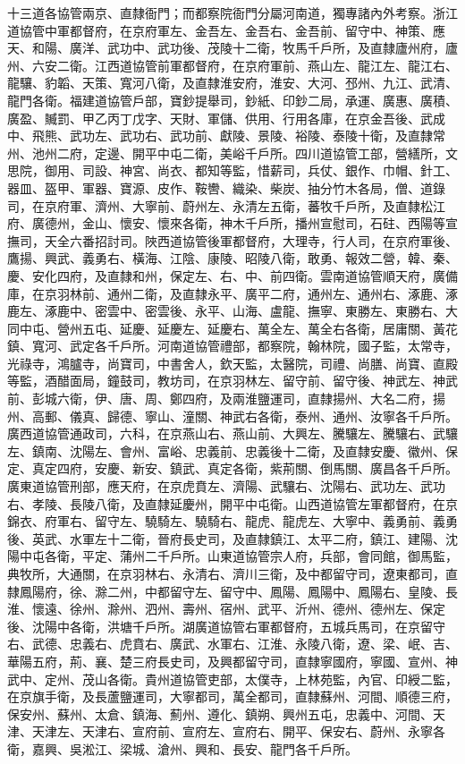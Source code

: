 十三道各協管兩京、直隸衙門；而都察院衙門分屬河南道，獨專諸內外考察。浙江道協管中軍都督府，在京府軍左、金吾左、金吾右、金吾前、留守中、神策、應天、和陽、廣洋、武功中、武功後、茂陵十二衛，牧馬千戶所，及直隸廬州府，廬州、六安二衛。江西道協管前軍都督府，在京府軍前、燕山左、龍江左、龍江右、龍驤、豹韜、天策、寬河八衛，及直隸淮安府，淮安、大河、邳州、九江、武清、龍門各衛。福建道協管戶部，寶鈔提舉司，鈔紙、印鈔二局，承運、廣惠、廣積、廣盈、贓罰、甲乙丙丁戊字、天財、軍儲、供用、行用各庫，在京金吾後、武成中、飛熊、武功左、武功右、武功前、獻陵、景陵、裕陵、泰陵十衛，及直隸常州、池州二府，定邊、開平中屯二衛，美峪千戶所。四川道協管工部，營繕所，文思院，御用、司設、神宮、尚衣、都知等監，惜薪司，兵仗、銀作、巾帽、針工、器皿、盔甲、軍器、寶源、皮作、鞍轡、織染、柴炭、抽分竹木各局，僧、道錄司，在京府軍、濟州、大寧前、蔚州左、永清左五衛，蕃牧千戶所，及直隸松江府、廣德州，金山、懷安、懷來各衛，神木千戶所，播州宣慰司，石砫、西陽等宣撫司，天全六番招討司。陜西道協管後軍都督府，大理寺，行人司，在京府軍後、鷹揚、興武、義勇右、橫海、江陰、康陵、昭陵八衛，敢勇、報效二營，韓、秦、慶、安化四府，及直隸和州，保定左、右、中、前四衛。雲南道協管順天府，廣備庫，在京羽林前、通州二衛，及直隸永平、廣平二府，通州左、通州右、涿鹿、涿鹿左、涿鹿中、密雲中、密雲後、永平、山海、盧龍、撫寧、東勝左、東勝右、大同中屯、營州五屯、延慶、延慶左、延慶右、萬全左、萬全右各衛，居庸關、黃花鎮、寬河、武定各千戶所。河南道協管禮部，都察院，翰林院，國子監，太常寺，光祿寺，鴻臚寺，尚寶司，中書舍人，欽天監，太醫院，司禮、尚膳、尚寶、直殿等監，酒醋面局，鐘鼓司，教坊司，在京羽林左、留守前、留守後、神武左、神武前、彭城六衛，伊、唐、周、鄭四府，及兩淮鹽運司，直隸揚州、大名二府，揚州、高郵、儀真、歸德、寧山、潼關、神武右各衛，泰州、通州、汝寧各千戶所。廣西道協管通政司，六科，在京燕山右、燕山前、大興左、騰驤左、騰驤右、武驤左、鎮南、沈陽左、會州、富峪、忠義前、忠義後十二衛，及直隸安慶、徽州、保定、真定四府，安慶、新安、鎮武、真定各衛，紫荊關、倒馬關、廣昌各千戶所。廣東道協管刑部，應天府，在京虎賁左、濟陽、武驤右、沈陽右、武功左、武功右、孝陵、長陵八衛，及直隸延慶州，開平中屯衛。山西道協管左軍都督府，在京錦衣、府軍右、留守左、驍騎左、驍騎右、龍虎、龍虎左、大寧中、義勇前、義勇後、英武、水軍左十二衛，晉府長史司，及直隸鎮江、太平二府，鎮江、建陽、沈陽中屯各衛，平定、蒲州二千戶所。山東道協管宗人府，兵部，會同館，御馬監，典牧所，大通關，在京羽林右、永清右、濟川三衛，及中都留守司，遼東都司，直隸鳳陽府，徐、滁二州，中都留守左、留守中、鳳陽、鳳陽中、鳳陽右、皇陵、長淮、懷遠、徐州、滁州、泗州、壽州、宿州、武平、沂州、德州、德州左、保定後、沈陽中各衛，洪塘千戶所。湖廣道協管右軍都督府，五城兵馬司，在京留守右、武德、忠義右、虎賁右、廣武、水軍右、江淮、永陵八衛，遼、梁、岷、吉、華陽五府，荊、襄、楚三府長史司，及興都留守司，直隸寧國府，寧國、宣州、神武中、定州、茂山各衛。貴州道協管吏部，太僕寺，上林苑監，內官、印綬二監，在京旗手衛，及長蘆鹽運司，大寧都司，萬全都司，直隸蘇州、河間、順德三府，保安州、蘇州、太倉、鎮海、薊州、遵化、鎮朔、興州五屯，忠義中、河間、天津、天津左、天津右、宣府前、宣府左、宣府右、開平、保安右、蔚州、永寧各衛，嘉興、吳淞江、梁城、滄州、興和、長安、龍門各千戶所。

